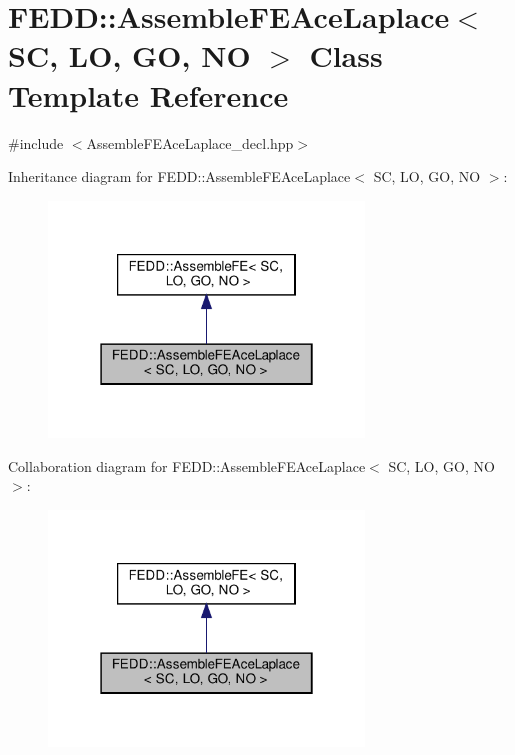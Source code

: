 \hypertarget{classFEDD_1_1AssembleFEAceLaplace}{}\section{F\+E\+DD\+:\+:Assemble\+F\+E\+Ace\+Laplace$<$ SC, LO, GO, NO $>$ Class Template Reference}
\label{classFEDD_1_1AssembleFEAceLaplace}


{\ttfamily \#include $<$Assemble\+F\+E\+Ace\+Laplace\+\_\+decl.\+hpp$>$}



Inheritance diagram for F\+E\+DD\+:\+:Assemble\+F\+E\+Ace\+Laplace$<$ SC, LO, GO, NO $>$\+:
\nopagebreak
\begin{figure}[H]
\begin{center}
\leavevmode
\includegraphics[width=238pt]{classFEDD_1_1AssembleFEAceLaplace__inherit__graph}
\end{center}
\end{figure}


Collaboration diagram for F\+E\+DD\+:\+:Assemble\+F\+E\+Ace\+Laplace$<$ SC, LO, GO, NO $>$\+:
\nopagebreak
\begin{figure}[H]
\begin{center}
\leavevmode
\includegraphics[width=238pt]{classFEDD_1_1AssembleFEAceLaplace__coll__graph}
\end{center}
\end{figure}
